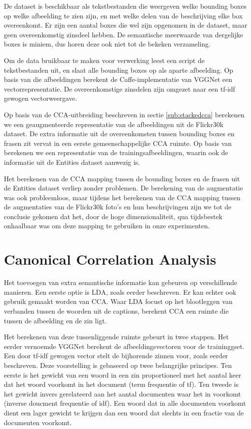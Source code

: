 De dataset is beschikbaar als tekstbestanden die weergeven welke bounding boxes op welke afbeelding te zien zijn, en met welke delen van de beschrijving elke box overeenkomt. Er zijn een aantal boxes die wel zijn opgenomen in de dataset, maar geen overeenkomstig zinsdeel hebben. De semantische meerwaarde van dergelijke boxes is miniem, dus horen deze ook niet tot de bekeken verzameling. 

Om de data bruikbaar te maken voor verwerking leest een script de tekstbestanden uit, en slaat alle bounding boxes op als aparte afbeelding. Op basis van die afbeeldingen berekent de Caffe-implementatie van VGGNet een vectorrepresentatie. De overeenkomstige zinsdelen zijn omgezet naar een tf-idf gewogen vectorweergave. 

Op basis van de CCA-uitbreiding beschreven in sectie \ref{sub:stackedcca} berekenen we een geaugmenteerde representatie van de afbeeldingen uit de Flickr30k dataset. De extra informatie uit de overeenkomsten tussen bounding boxes en frasen zit vervat in een eerste gemeenschappelijke CCA ruimte. Op basis van \cite{Gong2014} berekenen we een representatie van de trainingsafbeeldingen, waarin ook de informatie uit de Entities dataset aanwezig is.

Het berekenen van de CCA mapping tussen de bounding boxes en de frasen uit de Entities dataset verliep zonder problemen. De berekening van de augmentatie was ook probleemloos, maar tijdens het berekenen van de CCA mapping tussen de augmentaties van de Flickr30k foto's en hun beschrijvingen zijn we tot de conclusie gekomen dat het, door de hoge dimensionaliteit, qua tijdsbestek onhaalbaar was om deze mapping te gebruiken in onze experimenten. 



\section{Canonical Correlation Analysis}
Het toevoegen van extra semantische informatie kan gebeuren op verschillende manieren. Een eerste optie is LDA, zoals eerder beschreven. Er kan echter ook gebruik gemaakt worden van CCA. Waar LDA focust op het blootleggen van verbanden tussen de woorden uit de captions, berekent CCA een ruimte die tussen de afbeelding en de zin ligt.

Het berekenen van deze tussenliggende ruimte gebeurt in twee stappen. Het eerder vernoemde VGGNet berekent de afbeeldingsvectoren voor de traininggset. Een door tf-idf gewogen vector stelt de bijhorende zinnen voor, zoals eerder beschreven. Deze voorstelling is gebaseerd op twee belangrijke principes. Ten eerste is het gewicht van een woord in een zin proportioneel met het aantal keer dat het woord voorkomt in het document (term frequentie of tf). Ten tweede is het gewicht invers gerelateerd aan het aantal documenten waar het in voorkomt (inverse doucment frequentie of idf). Een woord dat in alle documenten voorkomt dient een lager gewicht te krijgen dan een woord dat slechts in een fractie van de documenten voorkomt.

